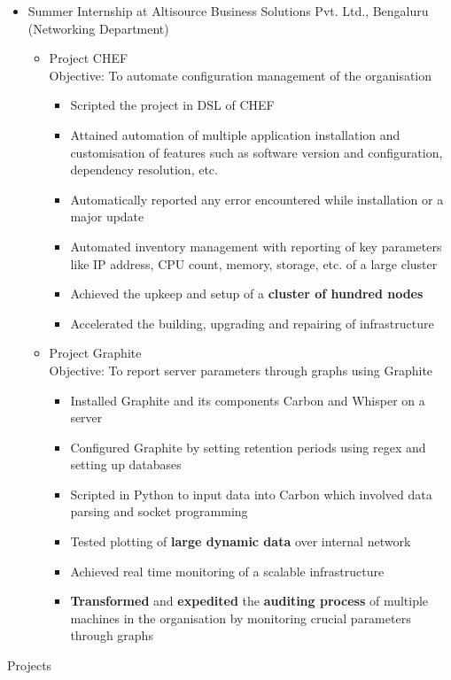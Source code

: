 \documentclass{article}
\begin{document}
\begin{itemize}[leftmargin=0.07cm]
\item {\large Summer Internship at Altisource Business Solutions Pvt. Ltd., Bengaluru}\newline
(Networking Department)\hspace*{\fill}
	\begin{itemize}[leftmargin=0.07cm]
	\item Project CHEF\vspace{0.1cm}\\
	\vspace{0.1cm}
	Objective: To automate configuration management of the organisation
	\begin{itemize}
	\item Scripted the project in DSL of CHEF
	\item Attained automation of multiple application installation and customisation of features such as software version and configuration,  dependency resolution, etc.
	\item Automatically reported any error encountered while installation or a major update
	\item Automated inventory management with reporting  of key parameters like IP address, CPU count, memory, storage, etc. of a large cluster
    \item Achieved the upkeep and setup of a \textbf{cluster of hundred nodes}
	\item Accelerated the building, upgrading and repairing of infrastructure\end{itemize}
	\vspace{0.6cm}
	\item Project Graphite\vspace{0.1cm}\\
	\vspace{0.1cm}
	Objective: To report server parameters through graphs using Graphite
	\begin{itemize}
	\item Installed Graphite and its components Carbon and Whisper on a server
	\item Configured Graphite by setting retention periods using regex and setting up databases
	\item Scripted in Python to input data into Carbon which involved data parsing and socket programming
	\item Tested plotting of \textbf{large dynamic data} over internal network
	\item Achieved real time monitoring of a scalable infrastructure 
	\item \textbf{Transformed} and \textbf{expedited} the \textbf{auditing process} of multiple machines in the organisation by monitoring crucial parameters through graphs 
	\end{itemize}
	
	\end{itemize}
\end{itemize}
\vspace{100pt}
{\Large Projects}
\end{document}
